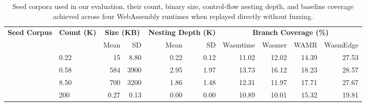 \begin{table}[t]
    \centering
    \footnotesize
    \setlength{\tabcolsep}{12.5pt}
    \renewcommand{\arraystretch}{1}
    \setlength{\aboverulesep}{1pt}
    \setlength{\belowrulesep}{1pt}
    \caption{Seed corpora used in our evaluation, their count, binary size, control-flow nesting depth, and baseline coverage achieved across four WebAssembly runtimes when replayed directly without fuzzing.}
    \label{tab:seed_corpora}
    \begin{tabular}{@{}p{2cm}lrrrrrrrr@{}}
        \toprule
        \multirow{2}{*}{\textbf{Seed Corpus}} &
        \multirow{2}{*}{\textbf{Count (K)}} &
        \multicolumn{2}{c}{\textbf{Size (KB)}} &
        \multicolumn{2}{c}{\textbf{Nesting Depth (K)}} &
        \multicolumn{4}{c}{\textbf{Branch Coverage (\%)}} \\
        \cmidrule(lr){3-4}
        \cmidrule(lr){5-6}
        \cmidrule(lr){7-10}
        & & Mean & SD & Mean & SD &
        Wasmtime & Wasmer & WAMR & WasmEdge \\
        \midrule
        \llvmbench{}
        & 0.22 & 15 & 8.80 & 0.22 & 0.12 & 11.02 & 12.02 & 14.39 & 27.53 \\
        \textbf{\tname{}}
        & 0.58 & 584 & 3900 & 2.95 & 1.97 & 13.73 & 16.12 & 18.23 & 28.57 \\
        \wasmbench{}
        & 8.50 & 700 & 3200 & 1.86 & 1.48 & 12.31 & 11.97 & 17.71 & 27.67 \\
        \specbench{}
        & 200 & 0.27 & 0.13 & 0.00 & 0.00 & 10.89 & 10.01 & 15.32 & 19.81 \\
        \bottomrule
    \end{tabular}
\end{table}
